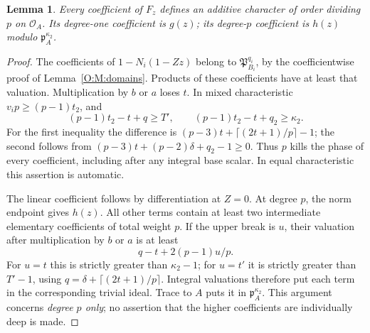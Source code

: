 \documentclass[11pt]{amsart}
\newtheorem{lemma}[theorem]{Lemma}
\theoremstyle{definition}
\theoremstyle{remark}
\newcommand{\OO}{\mathcal O}\newcommand{\pp}{\mathfrak p}\newcommand{\PP}{\mathfrak P}
\begin{document}
\begin{lemma}\label{O:M:polycoeff}
Every coefficient of $F_z$ defines an additive character of order dividing
$p$ on $\OO_A$. Its degree-one coefficient is $g(z)$; its degree-$p$
coefficient is $h(z)$ modulo $\pp_A^{\kappa_2}$.
\end{lemma}
\begin{proof}
The coefficients of $1-N_i(1-Zz)$ belong to $\PP_{B_i}^{q_i}$,
by the coefficientwise proof of Lemma~\ref{O:M:domains}. Products of these
coefficients have at least that valuation. Multiplication by $b$ or $a$
loses $t$. In mixed characteristic $v_i p\ge(p-1)t_2$, and
\[
 (p-1)t_2-t+q\ge T',\qquad
 (p-1)t_2-t+q_2\ge \kappa_2.
\]
For the first inequality the difference is
$(p-3)t+\lceil(2t+1)/p\rceil-1$; the second follows from
$(p-3)t+(p-2)\delta+q_2-1\ge0$.
Thus $p$ kills the phase of every coefficient, including after any integral
base scalar. In equal characteristic this assertion is automatic.

The linear coefficient follows by differentiation at $Z=0$.
At degree $p$, the norm endpoint gives $h(z)$. All other terms contain at
least two intermediate elementary coefficients of total weight $p$.
If the upper break is $u$, their valuation after multiplication by $b$ or
$a$ is at least
\[
 q-t+2(p-1)u/p.
\]
For $u=t$ this is strictly greater than $\kappa_2-1$; for $u=t'$ it is
strictly greater than $T'-1$, using
$q=\delta+\lceil(2t+1)/p\rceil$. Integral valuations therefore put
each term in the corresponding trivial ideal. Trace to $A$ puts it in
$\pp_A^{\kappa_2}$. This argument concerns \emph{degree $p$ only}; no assertion
that the higher coefficients are individually deep is made.
\end{proof}
\end{document}
